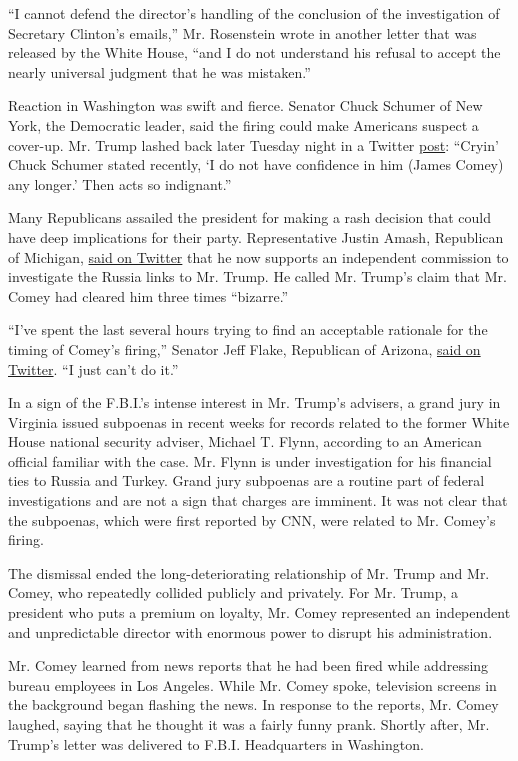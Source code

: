 ``I cannot defend the director's handling of the conclusion of the
investigation of Secretary Clinton's emails,'' Mr. Rosenstein wrote in
another letter that was released by the White House, ``and I do not
understand his refusal to accept the nearly universal judgment that he
was mistaken.''

Reaction in Washington was swift and fierce. Senator Chuck Schumer of
New York, the Democratic leader, said the firing could make Americans
suspect a cover-up. Mr. Trump lashed back later Tuesday night in a
Twitter
\href{https://twitter.com/realDonaldTrump/status/862135824745467905}{post}:
``Cryin' Chuck Schumer stated recently, `I do not have confidence in him
(James Comey) any longer.' Then acts so indignant.''

Many Republicans assailed the president for making a rash decision that
could have deep implications for their party. Representative Justin
Amash, Republican of Michigan,
\href{https://twitter.com/justinamash/status/862089192603607041}{said on
Twitter} that he now supports an independent commission to investigate
the Russia links to Mr. Trump. He called Mr. Trump's claim that Mr.
Comey had cleared him three times ``bizarre.''

``I've spent the last several hours trying to find an acceptable
rationale for the timing of Comey's firing,'' Senator Jeff Flake,
Republican of Arizona,
\href{https://twitter.com/JeffFlake/status/862124755339685888}{said on
Twitter}. ``I just can't do it.''

In a sign of the F.B.I.'s intense interest in Mr. Trump's advisers, a
grand jury in Virginia issued subpoenas in recent weeks for records
related to the former White House national security adviser, Michael T.
Flynn, according to an American official familiar with the case. Mr.
Flynn is under investigation for his financial ties to Russia and
Turkey. Grand jury subpoenas are a routine part of federal
investigations and are not a sign that charges are imminent. It was not
clear that the subpoenas, which were first reported by CNN, were related
to Mr. Comey's firing.

The dismissal ended the long-deteriorating relationship of Mr. Trump and
Mr. Comey, who repeatedly collided publicly and privately. For Mr.
Trump, a president who puts a premium on loyalty, Mr. Comey represented
an independent and unpredictable director with enormous power to disrupt
his administration.

Mr. Comey learned from news reports that he had been fired while
addressing bureau employees in Los Angeles. While Mr. Comey spoke,
television screens in the background began flashing the news. In
response to the reports, Mr. Comey laughed, saying that he thought it
was a fairly funny prank. Shortly after, Mr. Trump's letter was
delivered to F.B.I. Headquarters in Washington.

